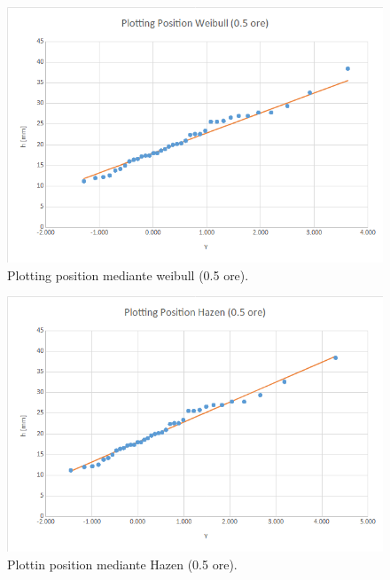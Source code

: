     \begin{figure}[H]\centering
        \includegraphics[scale=.5]{immagini/plot_pos_weib_05ore.png}
        \caption{Plotting position mediante weibull (0.5 ore).}
      \label{plot_pos_weib_05ore}
    \end{figure}

    \begin{figure}[H]\centering
        \includegraphics[scale=.5]{immagini/plot_pos_hazen_05ore.png}
        \caption{Plottin position mediante Hazen (0.5 ore).}
      \label{plot_pos_hazen_05ore}
    \end{figure}

